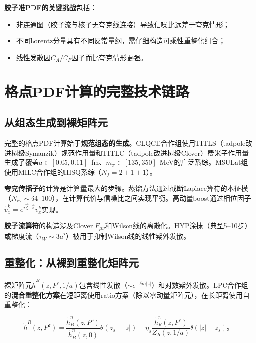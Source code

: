 \documentclass[12pt,a4paper]{ctexart}
\theoremstyle{definition}
\begin{document}
\textbf{胶子准PDF的关键挑战}包括：
\begin{itemize}
    \item 非连通图（胶子流与核子无夸克线连接）导致信噪比远差于夸克情形\cite{Chen2025gluon}；
    \item 不同Lorentz分量具有不同反常量纲，需仔细构造可乘性重整化组合\cite{Zhang2019}；
    \item 线性发散因$C_A/C_F$因子而比夸克情形更强\cite{Chen2025gluon}。
\end{itemize}

\section{格点PDF计算的完整技术链路}

\subsection{从组态生成到裸矩阵元}

完整的格点PDF计算始于\textbf{规范组态的生成}。CLQCD合作组\cite{CLQCD2024,CLQCD2025}使用TITLS（tadpole改进树级Symanzik）规范作用量和TITLC（tadpole改进树级Clover）费米子作用量生成了覆盖$a \in [0.05, 0.11]$~fm、$m_\pi \in [135, 350]$~MeV的广泛系综。MSULat组\cite{NieMiera2025,Lin2025gluon}使用MILC合作组的HISQ系综（$N_f = 2+1+1$）。

\textbf{夸克传播子}的计算是计算量最大的步骤。蒸馏方法\cite{Peardon2009}通过截断Laplace算符的本征模（$N_{\text{ev}} \sim 64$--$100$），在计算代价与信噪比之间实现平衡。高动量boost通过相位因子$\tilde{v}^k_x = e^{i\vec{\zeta}\cdot\vec{z}}v^k_x$实现\cite{Egerer2021a}。

\textbf{胶子流算符}的构造涉及Clover $F_{\mu\nu}$和Wilson线的离散化。HYP涂抹（典型5--10步）或梯度流（$\tau_W \sim 3a^2$）被用于抑制Wilson线的线性紫外发散\cite{Chen2025gluon,NieMiera2025}。

\subsection{重整化：从裸到重整化矩阵元}

裸矩阵元$\tilde{h}^B(z, P^z, 1/a)$包含线性发散（$\sim e^{-\delta m|z|}$）和对数紫外发散。LPC合作组的\textbf{混合重整化方案}\cite{Ji2021hybrid}在短距离使用ratio方案（除以零动量矩阵元），在长距离使用自重整化：

\begin{equation}
\tilde{h}^R(z, P^z) = \frac{\tilde{h}^n_B(z, P^z)}{\tilde{h}^n_B(z, 0)} \theta(z_s - |z|) + \eta_s \frac{\tilde{h}^n_B(z, P^z)}{Z_R(z, 1/a)} \theta(|z| - z_s)。
\label{eq:hybrid}
\end{equation}
\end{document}
